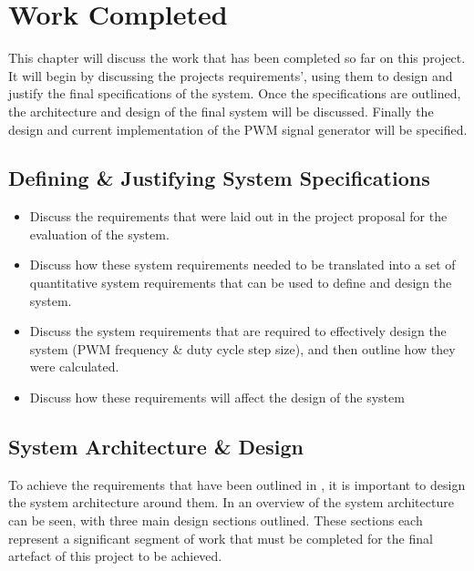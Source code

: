 \chapter{Work Completed}\label{C:work}

This chapter will discuss the work that has been completed so far on this project. It will begin by discussing the projects requirements', using them to design and justify the final specifications of the system. Once the specifications are outlined, the architecture and design of the final system will be discussed. Finally the design and current implementation of the PWM signal generator will be specified.  

\section{Defining \& Justifying System Specifications}\label{S:specs}

\begin{itemize}

    \item 
    Discuss the requirements that were laid out in the project proposal for the evaluation of the system. 

    \item 
    Discuss how these system requirements needed to be translated into a set of quantitative system requirements that can be used to define and design the system.
    
    \item 
    Discuss the system requirements that are required to effectively design the system (PWM frequency \& duty cycle step size), and then outline how they were calculated.
    
    \item 
    Discuss how these requirements will affect the design of the system

\end{itemize}

\section{System Architecture \& Design}\label{S:system}

To achieve the requirements that have been outlined in , it is important to design the system architecture around them. In  an overview of the system architecture can be seen, with three main design sections outlined. These sections each represent a significant segment of work that must be completed for the final artefact of this project to be achieved. \\

